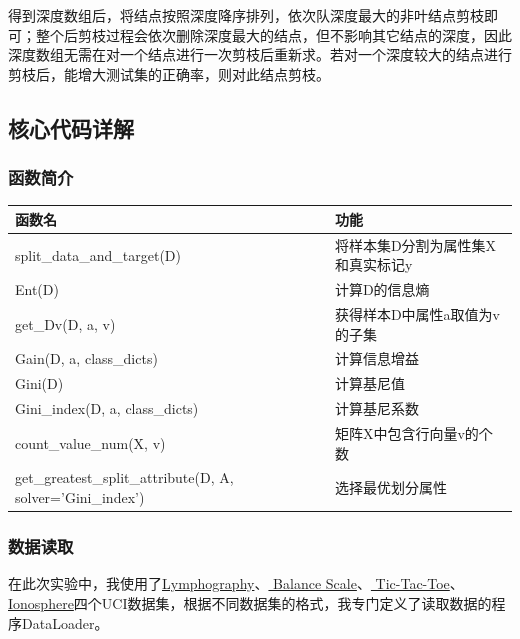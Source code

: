 \documentclass{ctexart}
\begin{document}
	得到深度数组后，将结点按照深度降序排列，依次队深度最大的非叶结点剪枝即可；整个后剪枝过程会依次删除深度最大的结点，但不影响其它结点的深度，因此深度数组无需在对一个结点进行一次剪枝后重新求。若对一个深度较大的结点进行剪枝后，能增大测试集的正确率，则对此结点剪枝。
	
	\subsection{核心代码详解}
	
	\subsubsection{函数简介}
	
	\begin{table}[!htb]
		\centering
		\begin{tabular}{|l|l|}
			\hline
			函数名&功能\\
			\hline
			split\_data\_and\_target(D)&将样本集D分割为属性集X和真实标记y\\
			\hline
			Ent(D)&计算D的信息熵\\
			\hline
			get\_Dv(D, a, v)&获得样本D中属性a取值为v的子集\\
			\hline
			Gain(D, a, class\_dicts)&计算信息增益\\
			\hline
			Gini(D)&计算基尼值\\
			\hline
			Gini\_index(D, a, class\_dicts)&计算基尼系数\\
			\hline
			count\_value\_num(X, v)&矩阵X中包含行向量v的个数\\
			\hline
			get\_greatest\_split\_attribute(D, A, solver='Gini\_index')&选择最优划分属性\\
			\hline
		\end{tabular}
	\end{table}
	
	\subsubsection{数据读取}
	
	在此次实验中，我使用了\href{https://archive.ics.uci.edu/ml/datasets/Lymphography}{Lymphography}、\href{https://archive.ics.uci.edu/ml/datasets/balance+scale}{
		Balance Scale}、\href{https://archive.ics.uci.edu/ml/datasets/Tic-Tac-Toe+Endgame}{
		Tic-Tac-Toe}、\href{https://archive.ics.uci.edu/ml/datasets/Ionosphere}{
		Ionosphere}四个UCI数据集，根据不同数据集的格式，我专门定义了读取数据的程序DataLoader。
	
\end{document}
